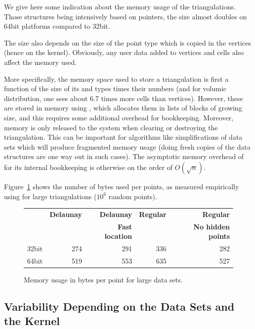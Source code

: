 We give here some indication about the memory usage of the triangulations.
Those structures being intensively based on pointers, the size almost doubles
on 64bit platforms compared to 32bit.

The size also depends on the size of the point type which is copied in the
vertices (hence on the kernel).  Obviously, any user data added to vertices
and cells also affect the memory used.

More specifically, the memory space used to store a triangulation is first
a function of the size of its  and  types times their
numbers (and for volumic distribution, one sees about 6.7 times more cells than
vertices).  However, these are stored in memory using ,
which allocates them in lists of blocks of growing size, and this requires some
additional overhead for bookkeeping.  Moreover, memory is only released to the
system when clearing or destroying the triangulation.  This can be important
for algorithms like simplifications of data sets which will produce fragmented
memory usage (doing fresh copies of the data structures are one way out in such
cases).  The asymptotic memory overhead of  for its
internal bookkeeping is otherwise on the order of $O(\sqrt{n})$.

Figure~\ref{Triangulation3-fig-memory} shows the number of bytes used per
points, as measured empirically using  for large triangulations
($10^6$ random points).

\begin{figure}[htbp]
\begin{center}
\begin{tabular}{|l||r|r|r|r|}
\hline
& \textbf{Delaunay} & \textbf{Delaunay}      & \textbf{Regular} & \textbf{Regular} \\
&                   & \textbf{Fast location} &                  & \textbf{No hidden points} \\
\hline\hline
32bit & 274 & 291 & 336 & 282 \\
\hline
64bit & 519 & 553 & 635 & 527 \\
\hline
\end{tabular}
\end{center}
\caption{Memory usage in bytes per point for large data sets.
\label{Triangulation3-fig-memory}}
\end{figure}


\subsection{Variability Depending on the Data Sets and the Kernel}

